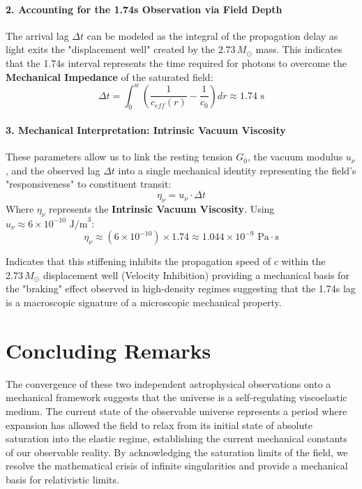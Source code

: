 \documentclass{article}
\begin{document}
\paragraph{2. Accounting for the 1.74s Observation via Field Depth}
The arrival lag $\Delta t$ can be modeled as the integral of the propagation delay as light exits the "displacement well" created by the $2.73 \, M_{\odot}$ mass. This indicates that the 1.74s interval represents the time required for photons to overcome the \textbf{Mechanical Impedance} of the saturated field:
\begin{equation}
\Delta t = \int_{0}^{w} \left( \frac{1}{c_{eff}(r)} - \frac{1}{c_0} \right) dr \approx 1.74 \text{ s}
\end{equation}



\paragraph{3. Mechanical Interpretation: Intrinsic Vacuum Viscosity}
These parameters allow us to link the resting tension $G_0$, the vacuum modulus $u_\nu$, and the observed lag $\Delta t$ into a single mechanical identity representing the field's "responsiveness" to constituent transit:
\begin{equation}
\eta_\nu = u_\nu \cdot \Delta t
\end{equation}
Where $\eta_\nu$ represents the \textbf{Intrinsic Vacuum Viscosity}. Using $u_\nu \approx 6 \times 10^{-10} \text{ J/m}^3$:
\begin{equation}
\eta_\nu \approx (6 \times 10^{-10}) \times 1.74 \approx 1.044 \times 10^{-9} \text{ Pa}\cdot\text{s}
\end{equation}

Indicates that this stiffening inhibits the propagation speed of $c$ within the $2.73 \, M_{\odot}$ displacement well (Velocity Inhibition) providing a mechanical basis for the "braking" effect observed in high-density regimes suggesting that the 1.74s lag is a macroscopic signature of a microscopic mechanical property. 


\section{Concluding Remarks}
The convergence of these two independent astrophysical observations onto a mechanical framework suggests that the universe is a self-regulating viscoelastic medium. The current state of the observable universe represents a period where expansion has allowed the field to relax from its initial state of absolute saturation into the elastic regime, establishing the current mechanical constants of our observable reality. By acknowledging the saturation limits of the field, we resolve the mathematical crisis of infinite singularities and provide a mechanical basis for relativistic limits.
\end{document}
